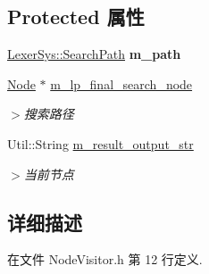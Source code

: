 \subsection*{Protected 属性}
\begin{DoxyCompactItemize}
\item 
\hypertarget{class_file_sys_1_1_node_visitor_a9985967f38e74d6e291330e7d609d21d}{\hyperlink{class_lexer_sys_1_1_search_path}{Lexer\-Sys\-::\-Search\-Path} {\bfseries m\-\_\-path}}\label{class_file_sys_1_1_node_visitor_a9985967f38e74d6e291330e7d609d21d}

\item 
\hypertarget{class_file_sys_1_1_node_visitor_adec163e2daf9387ddef7166162820881}{\hyperlink{class_file_sys_1_1_node}{Node} $\ast$ \hyperlink{class_file_sys_1_1_node_visitor_adec163e2daf9387ddef7166162820881}{m\-\_\-lp\-\_\-final\-\_\-search\-\_\-node}}\label{class_file_sys_1_1_node_visitor_adec163e2daf9387ddef7166162820881}

\begin{DoxyCompactList}\small\item\em $>$搜索路径 \end{DoxyCompactList}\item 
\hypertarget{class_file_sys_1_1_node_visitor_ad2f5269bc83504009525d7fde95e99bf}{Util\-::\-String \hyperlink{class_file_sys_1_1_node_visitor_ad2f5269bc83504009525d7fde95e99bf}{m\-\_\-result\-\_\-output\-\_\-str}}\label{class_file_sys_1_1_node_visitor_ad2f5269bc83504009525d7fde95e99bf}

\begin{DoxyCompactList}\small\item\em $>$当前节点 \end{DoxyCompactList}\end{DoxyCompactItemize}


\subsection{详细描述}


在文件 Node\-Visitor.\-h 第 12 行定义.



